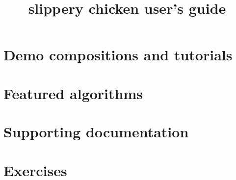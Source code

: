 \documentclass[a4paper, 10pt]{book}
\title{slippery chicken user's guide}
\author{}
\date{}
\begin{document}
\maketitle
\tableofcontents

\part{Demo compositions and tutorials}







\part{Featured algorithms}






\part{Supporting documentation}













\part{Exercises}

\end{document}
